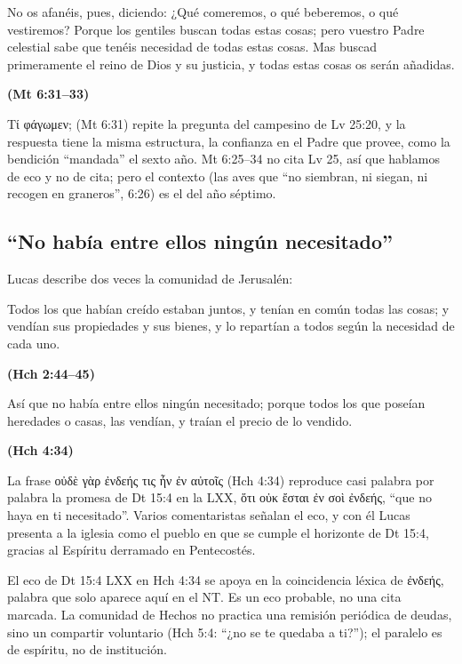 \documentclass[11pt,letterpaper]{article}
\newcommand{\grc}[1]{\foreignlanguage{ancientgreek}{#1}}
\newcommand{\fuente}[1]{\par\hfill{\upshape\bfseries\small\textcolor{tierraroja}{#1}}}
\begin{document}
\begin{cita}No os afanéis, pues, diciendo: ¿Qué comeremos, o qué beberemos, o qué vestiremos? Porque los gentiles buscan todas estas cosas; pero vuestro Padre celestial sabe que tenéis necesidad de todas estas cosas. Mas buscad primeramente el reino de Dios y su justicia, y todas estas cosas os serán añadidas.\fuente{(Mt 6:31--33)}\end{cita}

\grc{Τί φάγωμεν;} (Mt 6:31) repite la pregunta del campesino de Lv 25:20, y la respuesta tiene la misma estructura, la confianza en el Padre que provee, como la bendición ``mandada'' el sexto año. Mt 6:25--34 no cita Lv 25, así que hablamos de eco y no de cita; pero el contexto (las aves que ``no siembran, ni siegan, ni recogen en graneros'', 6:26) es el del año séptimo.

\subsection{``No había entre ellos ningún necesitado''}
Lucas describe dos veces la comunidad de Jerusalén:

\begin{cita}Todos los que habían creído estaban juntos, y tenían en común todas las cosas; y vendían sus propiedades y sus bienes, y lo repartían a todos según la necesidad de cada uno.\fuente{(Hch 2:44--45)}\end{cita}
\begin{cita}Así que no había entre ellos ningún necesitado; porque todos los que poseían heredades o casas, las vendían, y traían el precio de lo vendido.\fuente{(Hch 4:34)}\end{cita}

La frase \grc{οὐδὲ γὰρ ἐνδεής τις ἦν ἐν αὐτοῖς} (Hch 4:34) reproduce casi palabra por palabra la promesa de Dt 15:4 en la LXX, \grc{ὅτι οὐκ ἔσται ἐν σοὶ ἐνδεής}, ``que no haya en ti necesitado''. Varios comentaristas señalan el eco, y con él Lucas presenta a la iglesia como el pueblo en que se cumple el horizonte de Dt 15:4, gracias al Espíritu derramado en Pentecostés.

\begin{nota}[Precisión]
El eco de Dt 15:4 LXX en Hch 4:34 se apoya en la coincidencia léxica de \grc{ἐνδεής}, palabra que solo aparece aquí en el NT. Es un eco probable, no una cita marcada. La comunidad de Hechos no practica una remisión periódica de deudas, sino un compartir voluntario (Hch 5:4: ``¿no se te quedaba a ti?''); el paralelo es de espíritu, no de institución.
\end{nota}
\end{document}
